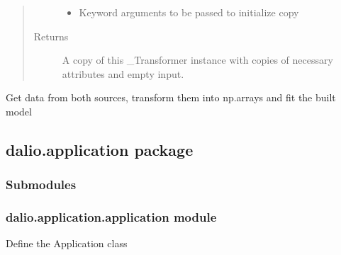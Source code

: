 \documentclass[letterpaper,10pt,english]{sphinxmanual}
\begin{document}
\begin{fulllineitems}
\begin{fulllineitems}
\begin{quote}
\begin{description}
\begin{itemize}
\item {} 
 \textendash{} Keyword arguments to be passed to initialize copy

\end{itemize}

\item[{Returns}] \leavevmode
A copy of this \_Transformer instance with copies of necessary
attributes and empty input.

\end{description}\end{quote}

\end{fulllineitems}


\begin{fulllineitems}
\label{\detokenize{dalio.model:dalio.model.XYLinearModel.run}}
Get data from both sources, transform them into np.arrays and
fit the built model

\end{fulllineitems}


\end{fulllineitems}



\subsection{dalio.application package}
\label{\detokenize{dalio.application:dalio-application-package}}\label{\detokenize{dalio.application::doc}}

\subsubsection{Submodules}
\label{\detokenize{dalio.application:submodules}}

\subsubsection{dalio.application.application module}
\label{\detokenize{dalio.application:module-dalio.application.application}}\label{\detokenize{dalio.application:dalio-application-application-module}}
Define the Application class
\end{document}
